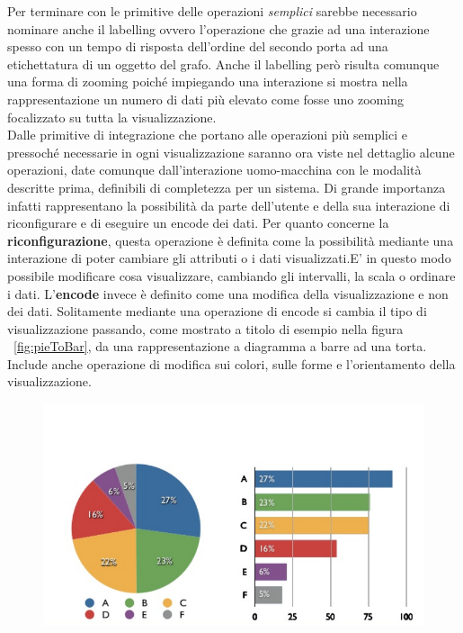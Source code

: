 {Per terminare con le primitive delle operazioni \textit{semplici} sarebbe necessario nominare anche il labelling ovvero l'operazione che grazie ad una interazione spesso con un tempo di risposta dell'ordine del secondo porta ad una etichettatura di un oggetto del grafo. Anche il labelling però risulta comunque una forma di zooming poiché impiegando una interazione si mostra nella rappresentazione un numero di dati più elevato come fosse uno zooming focalizzato su tutta la visualizzazione.\\
Dalle primitive di integrazione che portano alle operazioni più semplici e pressoché necessarie in ogni visualizzazione saranno ora viste nel dettaglio alcune operazioni, date comunque dall'interazione uomo-macchina con le modalità descritte prima, definibili di completezza per un sistema.
Di grande importanza infatti rappresentano la possibilità da parte dell'utente e della sua interazione di riconfigurare e di eseguire un encode dei dati.
Per quanto concerne la \textbf{riconfigurazione}, questa operazione è definita come la possibilità mediante una interazione di poter cambiare gli attributi o i dati visualizzati.E’ in questo modo possibile modificare cosa visualizzare, cambiando gli intervalli, la scala o ordinare i dati.
L'\textbf{encode }invece è definito come una modifica della visualizzazione e non dei dati. Solitamente mediante una operazione di encode si cambia il tipo di visualizzazione passando, come mostrato a titolo di esempio nella figura \figurename~\ref{fig:pieToBar}, da una rappresentazione a diagramma a barre ad una torta. Include anche operazione di modifica sui colori, sulle forme e l’orientamento della visualizzazione.
\begin{figure}[!htb]
	\begin{center}
		\hspace{-3.5 cm}
		\includegraphics[width=1 \linewidth]{figure/pieToBar}

\end{center}
\end{figure}}
